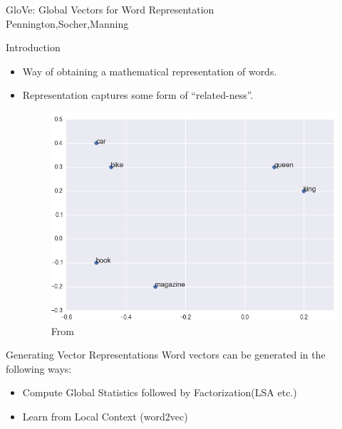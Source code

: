 \begin{frame}
  \begin{center}
    {\huge GloVe: Global Vectors for Word Representation
    } \\
    Pennington,Socher,Manning
  \end{center}
\end{frame}

\begin{frame}{Introduction}
  \begin{itemize}
  \item Way of obtaining a mathematical representation of words.
  \item Representation captures some form of ``related-ness''.
    \begin{figure}
      \includegraphics[scale=0.35]{images/wordvec.png}
      \caption{From}
    \end{figure}    
  \end{itemize}
\end{frame}

\begin{frame}{Generating Vector Representations}
  Word vectors can be generated in the following ways:
  \begin{itemize}
  \item Compute Global Statistics followed by Factorization(LSA etc.) %
  \item Learn from Local Context (word2vec) %
  \end{itemize}
\end{frame}

